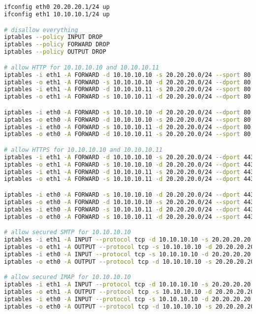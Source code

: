 \documentclass[12pt, a4paper]{article}
\begin{document}
\section{} %
\begin{lstlisting}[language=bash]
ifconfig eth0 20.20.20.1/24 up
ifconfig eth1 10.10.10.1/24 up

# disallow everything
iptables --policy INPUT DROP
iptables --policy FORWARD DROP
iptables --policy OUTPUT DROP

# allow HTTP for 10.10.10.10 and 10.10.10.11
iptables -i eth1 -A FORWARD -d 10.10.10.10 -s 20.20.20.0/24 --sport 80 -j ACCEPT
iptables -o eth1 -A FORWARD -s 10.10.10.10 -d 20.20.20.0/24 --dport 80 -j ACCEPT
iptables -i eth1 -A FORWARD -d 10.10.10.11 -s 20.20.20.0/24 --sport 80 -j ACCEPT
iptables -o eth1 -A FORWARD -s 10.10.10.11 -d 20.20.20.0/24 --dport 80 -j ACCEPT

iptables -i eth0 -A FORWARD -s 10.10.10.10 -d 20.20.20.0/24 --dport 80 -j ACCEPT
iptables -o eth0 -A FORWARD -d 10.10.10.10 -s 20.20.20.0/24 --sport 80 -j ACCEPT
iptables -i eth0 -A FORWARD -s 10.10.10.11 -d 20.20.20.0/24 --dport 80 -j ACCEPT
iptables -o eth0 -A FORWARD -d 10.10.10.11 -s 20.20.20.0/24 --sport 80 -j ACCEPT

# allow HTTPS for 10.10.10.10 and 10.10.10.11
iptables -i eth1 -A FORWARD -d 10.10.10.10 -s 20.20.20.0/24 --dport 443 -j ACCEPT
iptables -o eth1 -A FORWARD -s 10.10.10.10 -d 20.20.20.0/24 --dport 443 -j ACCEPT
iptables -i eth1 -A FORWARD -d 10.10.10.11 -s 20.20.20.0/24 --dport 443 -j ACCEPT
iptables -o eth1 -A FORWARD -s 10.10.10.11 -d 20.20.20.0/24 --dport 443 -j ACCEPT

iptables -i eth0 -A FORWARD -s 10.10.10.10 -d 20.20.20.0/24 --dport 443 -j ACCEPT
iptables -o eth0 -A FORWARD -d 10.10.10.10 -s 20.20.20.0/24 --sport 443 -j ACCEPT
iptables -i eth0 -A FORWARD -s 10.10.10.11 -d 20.20.20.0/24 --dport 443 -j ACCEPT
iptables -o eth0 -A FORWARD -s 10.10.10.11 -d 20.20.20.0/24 --sport 443 -j ACCEPT

# allow secured SMTP for 10.10.10.10
iptables -i eth1 -A INPUT --protocol tcp -d 10.10.10.10 -s 20.20.20.20.11 --sport 465 --jump ACCEPT
iptables -o eth1 -A OUTPUT --protocol tcp -s 10.10.10.10 -d 20.20.20.20.11 --dport 465 --jump ACCEPT
iptables -i eth0 -A INPUT --protocol tcp -s 10.10.10.10 -d 20.20.20.20.11 --dport 465 --jump ACCEPT
iptables -o eth0 -A OUTPUT --protocol tcp -d 10.10.10.10 -s 20.20.20.20.11 --sport 465 --jump ACCEPT

# allow secured IMAP for 10.10.10.10
iptables -i eth1 -A INPUT --protocol tcp -d 10.10.10.10 -s 20.20.20.20.11 --sport 993 --jump ACCEPT
iptables -o eth1 -A OUTPUT --protocol tcp -s 10.10.10.10 -d 20.20.20.20.11 --dport 993 --jump ACCEPT
iptables -i eth0 -A INPUT --protocol tcp -s 10.10.10.10 -d 20.20.20.20.11 --dport 993 --jump ACCEPT
iptables -o eth0 -A OUTPUT --protocol tcp -d 10.10.10.10 -s 20.20.20.20.11 --sport 993 --jump ACCEPT
\end{lstlisting}
\end{document}
